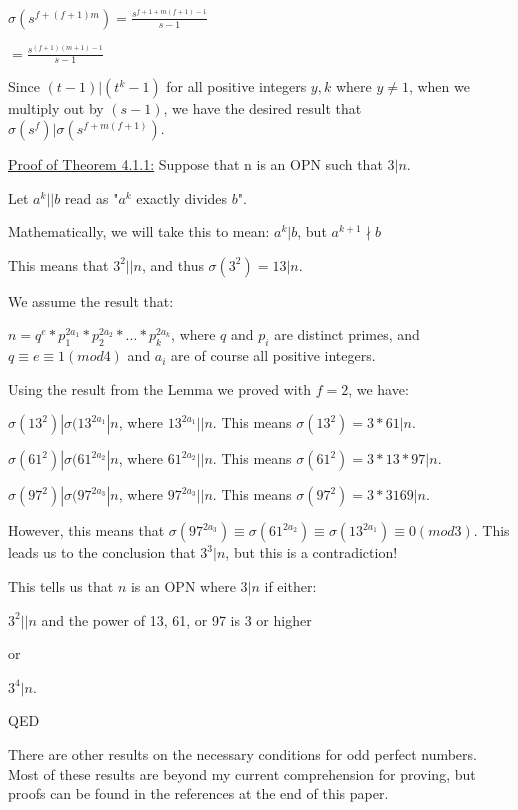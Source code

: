 \documentclass[12pt]{amsart}
\begin{document}
\begin{center}
$\sigma(s^{f+(f+1)m}) = \frac{s^{f+1+m(f+1)-1}}{s-1}$

$ = \frac{s^{(f+1)(m+1)-1}}{s-1}$
\end{center}

Since $(t-1)|(t^k -1)$ for all positive integers $y, k$ where $y \neq 1$, when we multiply out by $(s-1)$, we have the desired result that $\sigma(s^f)|\sigma(s^{f+m(f+1)})$.

\underline{Proof of Theorem 4.1.1:} Suppose that n is an OPN such that $3|n$.

Let $a^k||b$ read as "$a^k$ exactly divides $b$". 

Mathematically, we will take this to mean: $a^k | b$, but $a^{k+1} \nmid b$

This means that $3^2 || n$, and thus $\sigma(3^2) = 13|n$.

We assume the result that:

$n = q^e * p_1^{2a_1} * p_2^{2a_2} * ... * p_k^{2a_k}$, where $q$ and $p_i$ are distinct primes, and $q \equiv e \equiv 1 (mod 4)$ and $a_i$ are of course all positive integers.

Using the result from the Lemma we proved with $f = 2$, we have:

$\sigma(13^2) | \sigma(13^{2a_1} | n$, where $13^{2a_1} || n$. This means $\sigma(13^2) = 3*61|n$.

$\sigma(61^2) | \sigma(61^{2a_2} | n$, where $61^{2a_2} || n$. This means $\sigma(61^2) = 3*13*97|n$.

$\sigma(97^2) | \sigma(97^{2a_3} | n$, where $97^{2a_3} || n$. This means $\sigma(97^2) = 3*3169|n$.

However, this means that $\sigma(97^{2a_3}) \equiv \sigma(61^{2a_2}) \equiv \sigma(13^{2a_1}) \equiv 0 (mod 3)$. This leads us to the conclusion that $3^3|n$, but this is a contradiction!

This tells us that $n$ is an OPN where $3|n$ if either:

\begin {center}
$3^2 || n$ and the power of 13, 61, or 97 is 3 or higher

or

$3^4 | n$.
\end{center}

QED

\bigskip

There are other results on the necessary conditions for odd perfect numbers. Most of these results are beyond my current comprehension for proving, but proofs can be found in the references at the end of this paper.
\end{document}
